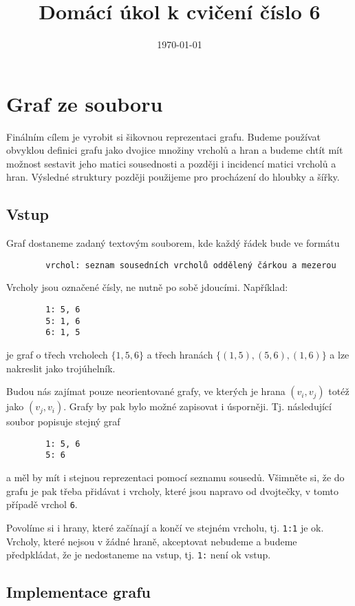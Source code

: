 \documentclass[12pt,oneside]{article}
\title{Domácí úkol k cvičení číslo 6}
\date{\today}
\begin{document}
	\maketitle
	
	\section{Graf ze souboru}
	
	Finálním cílem je vyrobit si šikovnou reprezentaci grafu.
	Budeme používat obvyklou definici grafu jako dvojice množiny vrcholů a hran a budeme chtít mít možnost sestavit jeho matici sousednosti a později i incidencí matici vrcholů a hran.
	Výsledné struktury později použijeme pro procházení do hloubky a šířky.
	
	\subsection{Vstup}
	
	Graf dostaneme zadaný textovým souborem, kde každý řádek bude ve formátu 
	\begin{verbatim}
		vrchol: seznam sousedních vrcholů oddělený čárkou a mezerou
	\end{verbatim}
	Vrcholy jsou označené čísly, ne nutně po sobě jdoucími.  
	Například:
		\begin{verbatim}
		1: 5, 6
		5: 1, 6
		6: 1, 5
	\end{verbatim}
	je graf o třech vrcholech $\{1, 5, 6\}$ a třech hranách $\{(1, 5), (5, 6), (1, 6)\}$ a lze nakreslit jako trojúhelník.
	
	Budou nás zajímat pouze neorientované grafy, ve kterých je hrana $(v_i, v_j)$ totéž jako $(v_j, v_i)$.
	Grafy by pak bylo možné zapisovat i úsporněji.
	Tj. následující soubor popisuje stejný graf
		\begin{verbatim}
		1: 5, 6
		5: 6
	\end{verbatim}
	a měl by mít i stejnou reprezentaci pomocí seznamu sousedů.
	Všimněte si, že do grafu je pak třeba přidávat i vrcholy, které jsou napravo od dvojtečky, v tomto případě vrchol \verb|6|.
	
	Povolíme si i hrany, které začínají a končí ve stejném vrcholu, tj. \verb*|1:1| je ok.
	Vrcholy, které nejsou v žádné hraně, akceptovat nebudeme a budeme předpkládat, že je nedostaneme na vstup, tj. \verb*|1:| není ok vstup.
	
	\subsection{Implementace grafu}
	
\end{document}
